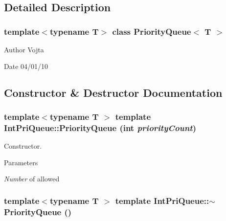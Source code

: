 \subsection{Detailed Description}
\subsubsection*{template$<$typename T$>$ class PriorityQueue$<$ T $>$}

\begin{DoxyAuthor}{Author}
Vojta 
\end{DoxyAuthor}
\begin{DoxyDate}{Date}
04/01/10 
\end{DoxyDate}


\subsection{Constructor \& Destructor Documentation}
\hypertarget{class_priority_queue_a26657301dcdb58a2b98c52868f4eff85}{
\subsubsection[{PriorityQueue}]{\setlength{\rightskip}{0pt plus 5cm}template$<$typename T $>$ template IntPriQueue::PriorityQueue (int {\em priorityCount})}}
\label{class_priority_queue_a26657301dcdb58a2b98c52868f4eff85}


Constructor. 


\begin{DoxyParams}{Parameters}
\item[{\em Number}]of allowed \end{DoxyParams}
\hypertarget{class_priority_queue_a69038745381e57fe65b3a5da985a5506}{
\subsubsection[{$\sim$PriorityQueue}]{\setlength{\rightskip}{0pt plus 5cm}template$<$typename T $>$ template IntPriQueue::$\sim$PriorityQueue ()}}
\label{class_priority_queue_a69038745381e57fe65b3a5da985a5506}


